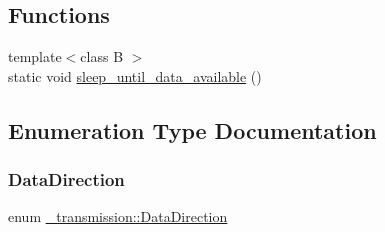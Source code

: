 \subsection*{Functions}
\begin{DoxyCompactItemize}
\item 
{\footnotesize template$<$class B $>$ }\\static void \hyperlink{namespace__transmission_a70202dcff902fb4413bc34bafaec97e0}{sleep\+\_\+until\+\_\+data\+\_\+available} ()
\end{DoxyCompactItemize}


\subsection{Enumeration Type Documentation}
\hypertarget{namespace__transmission_a49a33659d7c6abcf7f0180cd7e34fa0e}{}\label{namespace__transmission_a49a33659d7c6abcf7f0180cd7e34fa0e} 
\subsubsection{\texorpdfstring{Data\+Direction}{DataDirection}}
{\footnotesize\ttfamily enum \hyperlink{namespace__transmission_a49a33659d7c6abcf7f0180cd7e34fa0e}{\+\_\+transmission\+::\+Data\+Direction}\hspace{0.3cm}{\ttfamily [strong]}}

